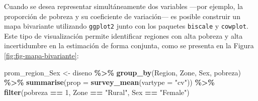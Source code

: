 \documentclass[
  spanish,
  12pt,
]{book}
\newenvironment{Shaded}{\begin{snugshade}}{\end{snugshade}}
\newcommand{\AttributeTok}[1]{\textcolor[rgb]{0.13,0.29,0.53}{#1}}
\newcommand{\DecValTok}[1]{\textcolor[rgb]{0.00,0.00,0.81}{#1}}
\newcommand{\FunctionTok}[1]{\textcolor[rgb]{0.13,0.29,0.53}{\textbf{#1}}}
\newcommand{\NormalTok}[1]{#1}
\newcommand{\OtherTok}[1]{\textcolor[rgb]{0.56,0.35,0.01}{#1}}
\newcommand{\SpecialCharTok}[1]{\textcolor[rgb]{0.81,0.36,0.00}{\textbf{#1}}}
\newcommand{\StringTok}[1]{\textcolor[rgb]{0.31,0.60,0.02}{#1}}
\begin{document}
Cuando se desea representar simultáneamente dos variables ---por ejemplo, la proporción de pobreza y su coeficiente de variación--- es posible construir un mapa bivariante utilizando \texttt{ggplot2} junto con los paquetes \texttt{biscale} y \texttt{cowplot}. Este tipo de visualización permite identificar regiones con alta pobreza y alta incertidumbre en la estimación de forma conjunta, como se presenta en la Figura \ref{fig:fig-mapa-bivariante}:

\begin{Shaded}
\begin{Highlighting}[]
\NormalTok{prom\_region\_Sex }\OtherTok{\textless{}{-}}\NormalTok{ diseno }\SpecialCharTok{\%\textgreater{}\%}
  \FunctionTok{group\_by}\NormalTok{(Region, Zone, Sex, pobreza) }\SpecialCharTok{\%\textgreater{}\%}
  \FunctionTok{summarise}\NormalTok{(}\AttributeTok{prop =} \FunctionTok{survey\_mean}\NormalTok{(}\AttributeTok{vartype =} \StringTok{"cv"}\NormalTok{)) }\SpecialCharTok{\%\textgreater{}\%}
  \FunctionTok{filter}\NormalTok{(pobreza }\SpecialCharTok{==} \DecValTok{1}\NormalTok{, Zone }\SpecialCharTok{==} \StringTok{"Rural"}\NormalTok{, Sex }\SpecialCharTok{==} \StringTok{"Female"}\NormalTok{)}
\end{Highlighting}
\end{Shaded}
\end{document}

